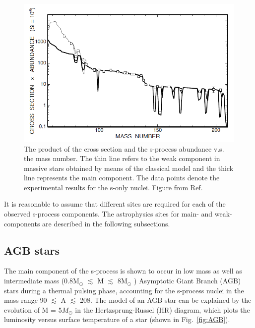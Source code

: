 \begin{figure}[tpb]
  \begin{center}
    \centerline{\includegraphics[scale=0.6]{graph/ch1/abundence}}
    \caption{The product of the cross section and the s-process abundance v.s. the mass number. The thin line refers to the weak component in massive stars obtained by means of the classical model and the thick line represents the main component. The  data points denote the experimental results for the s-only nuclei. Figure from Ref.~\citep{Kappeler2011}}
    \label{fig:abundance}
  \end{center}
\end{figure}


It is reasonable to assume that different sites are required for each of the observed s-process components. The astrophysics sites for main- and weak- components are described in the following subsections.


\subsection{AGB stars}

The main component of the s-process is shown to occur in low mass as well as intermediate mass (0.8M$_\odot$ $\lesssim$ M $\lesssim$ 8M$_\odot$ ) Asymptotic Giant Branch (AGB) stars during a thermal pulsing phase, accounting for the s-process nuclei in the mass range  90 $\lesssim$ A $\lesssim$ 208.  The model of an AGB star can be explained by the evolution of M = 5$M_{\odot}$ in  the Hertzsprung-Russel (HR) diagram, which plots the luminosity versus surface temperature of a star (shown in Fig.~\ref{fig:AGB}).

